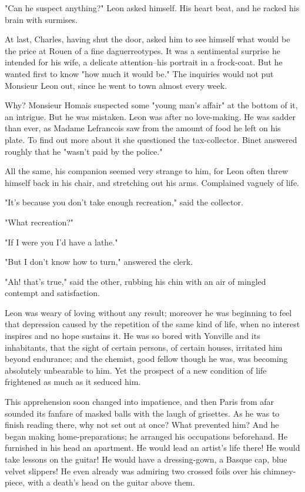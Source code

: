 \documentclass[11pt,twocolumn]{ltugboat}
\begin{document}
"Can he suspect anything?" Leon asked himself. His heart beat, and he
racked his brain with surmises.

At last, Charles, having shut the door, asked him to see himself
what would be the price at Rouen of a fine daguerreotypes. It was a
sentimental surprise he intended for his wife, a delicate attention--his
portrait in a frock-coat. But he wanted first to know "how much it would
be." The inquiries would not put Monsieur Leon out, since he went to
town almost every week.

Why? Monsieur Homais suspected some "young man's affair" at the bottom
of it, an intrigue. But he was mistaken. Leon was after no love-making.
He was sadder than ever, as Madame Lefrancois saw from the amount of
food he left on his plate. To find out more about it she questioned
the tax-collector. Binet answered roughly that he "wasn't paid by the
police."

All the same, his companion seemed very strange to him, for Leon often
threw himself back in his chair, and stretching out his arms. Complained
vaguely of life.

"It's because you don't take enough recreation," said the collector.

"What recreation?"

"If I were you I'd have a lathe."

"But I don't know how to turn," answered the clerk.

"Ah! that's true," said the other, rubbing his chin with an air of
mingled contempt and satisfaction.

Leon was weary of loving without any result; moreover he was beginning
to feel that depression caused by the repetition of the same kind of
life, when no interest inspires and no hope sustains it. He was so bored
with Yonville and its inhabitants, that the sight of certain persons,
of certain houses, irritated him beyond endurance; and the chemist, good
fellow though he was, was becoming absolutely unbearable to him. Yet
the prospect of a new condition of life frightened as much as it seduced
him.

This apprehension soon changed into impatience, and then Paris from afar
sounded its fanfare of masked balls with the laugh of grisettes. As he
was to finish reading there, why not set out at once? What prevented
him? And he began making home-preparations; he arranged his occupations
beforehand. He furnished in his head an apartment. He would lead an
artist's life there! He would take lessons on the guitar! He would have
a dressing-gown, a Basque cap, blue velvet slippers! He even already was
admiring two crossed foils over his chimney-piece, with a death's head
on the guitar above them.
\end{document}

